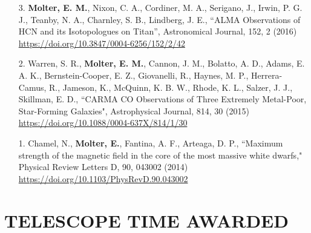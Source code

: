 \documentclass[margin, 10pt]{res} %
\begin{document}
\begin{resume}
{\begin{enumerate}
\item[3.] {\bf Molter, E. M.}, Nixon, C. A., Cordiner, M. A., Serigano, J., Irwin, P. G. J., Teanby, N. A., Charnley, S. B., Lindberg, J. E., ``ALMA Observations of
  HCN and its Isotopologues on Titan'', Astronomical Journal, 152, 2 (2016) \url{https://doi.org/10.3847/0004-6256/152/2/42}
  
\item[2.] Warren, S. R., {\bf Molter, E. M.}, Cannon, J. M., Bolatto, A. D., Adams, E. A. K., Bernstein-Cooper, E. Z., Giovanelli, R., Haynes, M. P., Herrera-Camus, R., Jameson, K., McQuinn, K. B. W., Rhode, K. L., Salzer, J. J., Skillman, E. D., ``CARMA
  CO Observations of Three Extremely Metal-Poor, Star-Forming
  Galaxies", Astrophysical Journal, 814, 30 (2015) \url{https://doi.org/10.1088/0004-637X/814/1/30}
  
\item[1.] Chamel, N., {\bf Molter, E.}, Fantina, A. F., Arteaga, D. P., ``Maximum strength of the magnetic field in the core of the most massive white dwarfs," Physical Review Letters D, 90, 043002 (2014) \url{https://doi.org/10.1103/PhysRevD.90.043002}
\end{enumerate}

}{}

\section{TELESCOPE TIME AWARDED}



\end{resume}
\end{document}
